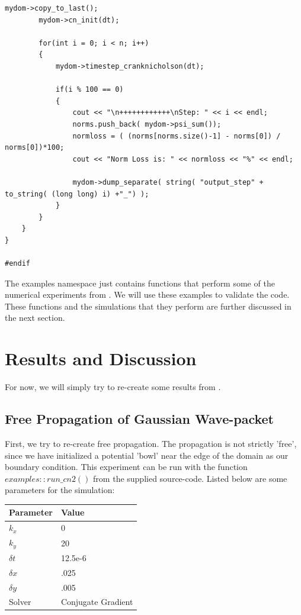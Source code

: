 \documentclass[letterpaper,12pt]{article}
\begin{document}
\begin{lstlisting}[caption=examples.h]
		mydom->copy_to_last();
		mydom->cn_init(dt);

		for(int i = 0; i < n; i++)
		{			
			mydom->timestep_cranknicholson(dt);
			
			if(i % 100 == 0)
			{
				cout << "\n++++++++++++\nStep: " << i << endl;
				norms.push_back( mydom->psi_sum());
				normloss = ( (norms[norms.size()-1] - norms[0]) / norms[0])*100;
				cout << "Norm Loss is: " << normloss << "%" << endl;

				mydom->dump_separate( string( "output_step" + to_string( (long long) i) +"_") );
			}
		}
	}
}

#endif
\end{lstlisting}

\vspace{5mm}

The examples namespace just contains functions that perform some of the numerical experiments from \citep{reference}.  We will use these examples to validate the code. These functions and the simulations that they perform are further discussed in the next section.

\vspace{5mm}

\section{Results and Discussion} 

For now, we will simply try to re-create some results from \citep{reference}.

\subsection{Free Propagation of Gaussian Wave-packet}

First, we try to re-create free propagation.  The propagation is not strictly 'free', since we have initialized a potential 'bowl' near the edge of the domain as our boundary condition.  This experiment can be run with the function $examples::run\_cn2()$ from the supplied source-code. Listed below are some parameters for the simulation:

\begin{center}
    \begin{tabular}{ | l | l  |}
    \hline
    Parameter & Value  \\ \hline
	$k_x$ & 0  \\ \hline
	$k_y$ & 20  \\ \hline    
	$\delta t$ & 12.5e-6  \\ \hline    
    $\delta x$ & .025  \\ \hline    
    $\delta y$ & .005  \\ \hline    
    Solver & Conjugate Gradient  \\ \hline            
    \hline
    \end{tabular}
\end{center}
\end{document}
